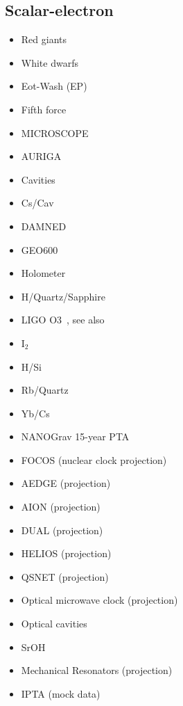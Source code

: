\documentclass[8pt,twocolumn]{extarticle}
\begin{document}
\begin{mdframed}
\subsection*{Scalar-electron}\vspace{-0.5em}
\begin{itemize}\setlength\itemsep{-0.5em}
	\item Red giants~\cite{Hardy:2016kme}
	\item White dwarfs~\cite{Bottaro:2023gep}
	\item Eot-Wash (EP)~\cite{Hees:2018fpg}
	\item Fifth force~\cite{Adelberger:2003zx,Fischbach:1996eq,Fienga:2023ocw,Mars}
	\item MICROSCOPE~\cite{Berge:2017ovy}
	\item AURIGA~\cite{Branca:2016rez}
	\item Cavities~\cite{Filzinger:2023qqh}
	\item Cs/Cav~\cite{Tretiak:2022ndx}
	\item DAMNED~\cite{Savalle:2020vgz}
	\item GEO600~\cite{Vermeulen:2021epa}
	\item Holometer~\cite{Aiello:2021wlp}
	\item H/Quartz/Sapphire~\cite{Campbell:2020fvq}
	\item LIGO O3~\cite{Gottel:2024cfj}, see also~\cite{Fukusumi:2023kqd}
	\item I$_2$~\cite{Oswald:2021vtc}
	\item H/Si~\cite{Kennedy:2020bac}
	\item Rb/Quartz~\cite{Zhang:2022ewz}
	\item Yb/Cs~\cite{Kobayashi:2022vsf}
	\item NANOGrav 15-year PTA~\cite{NANOGrav:2023hvm}
	\item FOCOS (nuclear clock projection)~\cite{Brzeminski:2022sde}
	\item AEDGE (projection)~\cite{Badurina:2021rgt}
	\item AION (projection)~\cite{Badurina:2021rgt}
	\item DUAL (projection)~\cite{Arvanitaki:2015iga}
	\item HELIOS (projection)~\cite{Hirschel:2023sbx}
		\item QSNET (projection)~\cite{Barontini:2021mvu}
		\item Optical microwave clock (projection)~\cite{Arvanitaki:2014faa}
\item Optical cavities~\cite{Geraci:2018fax}
\item SrOH~\cite{SrOH}
		\item Mechanical Resonators (projection)~\cite{Manley:2019vxy}
			\item IPTA (mock data)~\cite{Kaplan:2022lmz}

\end{itemize}
\end{mdframed}
\end{document}
